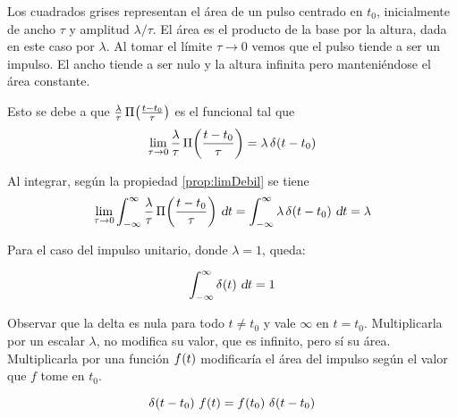 Los cuadrados grises representan el área de un pulso centrado en $t_0$, inicialmente de ancho $\tau$ y amplitud $\lambda / \tau$.
El área es el producto de la base por la altura, dada en este caso por $\lambda$.
Al tomar el límite $\tau \to 0$ vemos que el pulso tiende a ser un impulso.
El ancho tiende a ser nulo y la altura infinita pero manteniéndose el área constante.

Esto se debe a que $\frac{\lambda}{\tau} \, \pulse[t_0]{t}{\tau}$ es el funcional tal que
\begin{equation*}
    \lim_{\tau \to 0} \frac{\lambda}{\tau} \, \pulse[t_0]{t}{\tau} = \lambda \, \fx[\delta]{t-t_0}
\end{equation*}

Al integrar, según la propiedad \ref{prop:limDebil} se tiene
\begin{equation*}
    \lim_{\tau \to 0} \int_{-\infty}^\infty \frac{\lambda}{\tau} \, \pulse[t_0]{t}{\tau} \, \dif t
    = \int_{-\infty}^\infty \lambda \, \fx[\delta]{t-t_0} \, \dif t
    = \lambda
\end{equation*}

Para el caso del impulso unitario, donde $\lambda = 1$, queda:

\begin{mdframed}[style=PropertyFrame]
    \begin{prop}
        \label{prop:integralDeImpulsoUnitario}
    \end{prop}
    \begin{equation*}
        \int_{-\infty}^\infty \fx[\delta]{t} \, \dif t = 1
    \end{equation*}
\end{mdframed}

Observar que la delta es nula para todo $t \neq t_0$ y vale $\infty$ en $t = t_0$.
Multiplicarla por un escalar $\lambda$, no modifica su valor, que es infinito, pero sí su área.
Multiplicarla por una función $\fx{t}$ modificaría el área del impulso según el valor que $f$ tome en $t_0$.

\begin{mdframed}[style=PropertyFrame]
    \begin{prop}
        \label{prop:propiedadDeMuestreo}
    \end{prop}
    \begin{equation*}
        \fx[\delta]{t-t_0} \, \fx{t} = \fx{t_0} \, \fx[\delta]{t-t_0}
    \end{equation*}
\end{mdframed}

